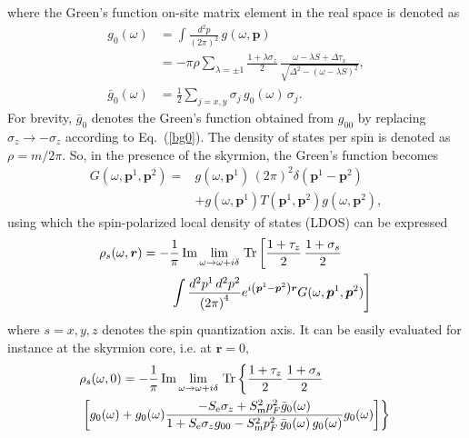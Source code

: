 \documentclass[twocolumn,showpacs,floatfix,longbibliography]{revtex4-1}
\begin{document}
where the Green's function on-site matrix element in the real space is denoted as 
\begin{align}
	g_{0}(\omega) &   =\int \frac{d^2 p}{\left( 2\pi \right)^2}\, g(\omega,\bm p)  	\label{g0} \\
	 & =-\pi\rho\sum_{\lambda = \pm 1} \frac{1+\lambda\sigma_z}{2}\,\frac{\omega-\lambda S+\Delta\tau_x}{\sqrt{\Delta^2-\left( \omega-\lambda S \right)^2}}, \nonumber \\
	 \bar g_{0}(\omega) & = \frac{1}{2} \sum_{j=x,y}\sigma_j\, g_{0}(\omega)\, \sigma_j.\label{bg0}
\end{align}
For brevity, $\bar g_{0}$ denotes the Green's function obtained from $g_{00}$ by replacing $\sigma_z \rightarrow - \sigma_z$ according to Eq.~(\ref{bg0}). The density of states per spin is denoted as $\rho = m/2\pi$. So, in the presence of the skyrmion, the Green's function becomes
\begin{align}
	G(\omega,\bm p^1,\bm p^2) =& g(\omega,\bm p^1)\,(2\pi)^2\delta(\bm p^1-\bm p^2) \nonumber \\ 
	          &  +g(\omega,\bm p^1) T(\bm p^1,\bm p^2) g(\omega,\bm p^2),
	\label{G}
\end{align}
using which the spin-polarized local density of states (LDOS) can be expressed
\begin{align}
	\rho_s(\omega,\bm r) = -&\frac{1}{\pi}\,{\rm Im}\lim_{\omega\rightarrow \omega+i\delta}{\rm\,Tr} \left[ \frac{1+\tau_z}{2}\,\frac{1+\sigma_s}{2} \right. \label{rhor} \\
	&\left.\int \frac{d^2p^1\,d^2p^2}{\left( 2\pi \right)^4} e^{i\left( \bm p^1-\bm p^2 \right)\bm r} G(\omega,\bm p^1,\bm p^2)\right]\, \nonumber 
\end{align}
where $s=x,y,z$ denotes the spin quantization axis. It can be easily evaluated for instance at the skyrmion core, i.e. at $\bm r=0$,
\begin{align}
	& \rho_s(\omega,0) = -\frac{1}{\pi}\,{\rm Im}\lim_{\omega\rightarrow \omega+i\delta}{\rm \,Tr} \left\{  \frac{1+\tau_z}{2}\,\frac{1+\sigma_s}{2}  \right. \label{spldos} \\
	&\left.\left[g_0(\omega)+g_0(\omega)  \frac{-S_{\rm e}\sigma_z+S^2_{\rm m}p_F^2\bar g_{0}(\omega)}{1+S_{\rm e}\sigma_zg_{00}-S^2_{\rm m}p_F^2\,\bar g_{0}(\omega)\, g_{0}(\omega)} g_0(\omega)  \right]\right\}\, \nonumber 
\end{align}

\end{document}
